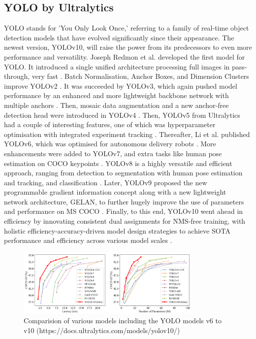     \subsection{YOLO by Ultralytics}
        YOLO stands for 'You Only Look Once,' referring to a family of real-time object detection models that have evolved significantly since their appearance. The newest version, YOLOv10, will raise the power from its predecessors to even more performance and versatility. Joseph Redmon et al. developed the first model for YOLO. It introduced a single unified architecture processing full images in pass-through, very fast \citep{redmon2016you}. Batch Normalisation, Anchor Boxes, and Dimension Clusters improve YOLOv2 \citep{redmon2017yolo9000}. It was succeeded by YOLOv3, which again pushed model performance by an enhanced and more lightweight backbone network with multiple anchors \citep{redmon2018yolov3}. Then, mosaic data augmentation and a new anchor-free detection head were introduced in YOLOv4 \citep{bochkovskiy2020yolov4}. Then, YOLOv5 from Ultralytics had a couple of interesting features, one of which was hyperparameter optimisation with integrated experiment tracking \citep{jocher2020yolov5}. Thereafter, Li et al. published YOLOv6, which was optimised for autonomous delivery robots \citep{li2022yolov6}. More enhancements were added to YOLOv7, and extra tasks like human pose estimation on COCO keypoints \citep{wang2023yolov7}. YOLOv8 is a highly versatile and efficient approach, ranging from detection to segmentation with human pose estimation and tracking, and classification \citep{ultralytics2023yolov8}. Later, YOLOv9 proposed the new programmable gradient information concept along with a new lightweight network architecture, GELAN, to further hugely improve the use of parameters and performance on MS COCO \citep{wang2024yolov9}. Finally, to this end, YOLOv10 went ahead in efficiency by innovating consistent dual assignments for NMS-free training, with holistic efficiency-accuracy-driven model design strategies to achieve SOTA performance and efficiency across various model scales \citep{wang2024yolov10}.

        \begin{figure}[htbp]
            \centering
            \includegraphics[width=0.8\textwidth]{figures/yolov10comp.png}
            \caption{Comparision of various models including the YOLO models v6 to v10 (https://docs.ultralytics.com/models/yolov10/)}
            \label{fig:yolo_comp}
        \end{figure}
